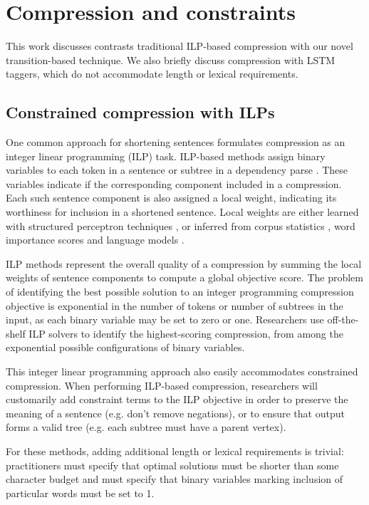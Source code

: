 \documentclass[11pt,a4paper]{article}
\begin{document}
\section{Compression and constraints}

This work discusses contrasts traditional ILP-based compression with our novel transition-based technique. We also briefly discuss compression with LSTM taggers, which do not accommodate length or lexical requirements.

\subsection{Constrained compression with ILPs}\label{s:ilps}

One common approach for shortening sentences formulates compression as an integer linear programming (ILP) task. ILP-based methods assign binary variables to each token in a sentence \cite{clarke2008global} or subtree in a dependency parse \cite{filippova2008dependency}. These variables indicate if the corresponding component included in a compression. Each such sentence component is also assigned a local weight, indicating its worthiness for inclusion in a shortened sentence. Local weights are either learned with structured perceptron techniques \cite{filippova2013overcoming}, or inferred from corpus statistics \cite{filippova2008dependency}, word importance scores and language models \cite{clarke2008global}.

ILP methods represent the overall quality of a compression by summing the local weights of sentence components to compute a global objective score.  The problem of identifying the best possible solution to an integer programming compression objective is exponential in the number of tokens or number of subtrees in the input, as each binary variable may be set to zero or one. Researchers use off-the-shelf ILP solvers to identify the highest-scoring compression, from among the exponential possible configurations of binary variables.

This integer linear programming approach also easily accommodates constrained compression. When performing ILP-based compression, researchers will customarily add constraint terms to the ILP objective in order to preserve the meaning of a sentence (e.g. don't remove negations), or to ensure that output forms a valid tree (e.g. each subtree must have a parent vertex).

For these methods, adding additional length or lexical requirements is trivial: practitioners must specify that optimal solutions must be shorter than some character budget and must specify that binary variables marking inclusion of particular words must be set to 1. 
\end{document}
